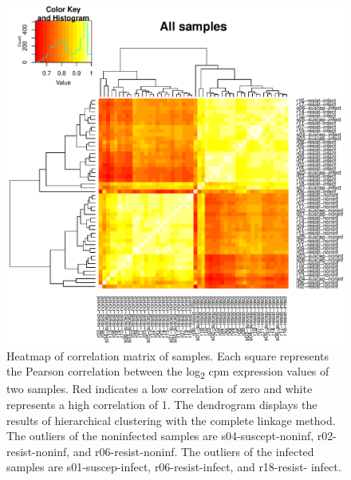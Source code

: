\documentclass[fleqn,10pt]{wlscirep}
\begin{document}
\begin{figure}[ht]
\centering
\includegraphics[width=\linewidth]{../figure/heatmap-all-samples.pdf}
\caption{
Heatmap of correlation matrix of samples. Each square represents the
Pearson correlation between the log\textsubscript{2} cpm expression
values of two samples. Red indicates a low correlation of zero and
white represents a high correlation of 1. The dendrogram displays the
results of hierarchical clustering with the complete linkage method.
The outliers of the noninfected samples are s04-suscept-noninf,
r02-resist-noninf, and r06-resist-noninf. The outliers of the infected
samples are s01-suscep-infect, r06-resist-infect, and r18-resist-
infect.
}
\label{fig:heat-all}
\end{figure}
\end{document}

